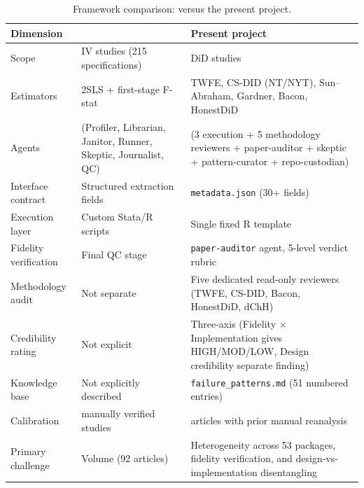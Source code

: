 \begin{table}[H]
\centering
\caption{Framework comparison: \textcite{xu2026scaling} versus the present project.}
\label{tab:framework_comparison}
\small
\begin{tabular}{>{\raggedright\arraybackslash}p{3.4cm}
                >{\raggedright\arraybackslash}p{5.4cm}
                >{\raggedright\arraybackslash}p{5.4cm}}
\toprule
\textbf{Dimension} & \textbf{\textcite{xu2026scaling}} & \textbf{Present project} \\
\midrule
Scope                 & 92 IV studies (215 specifications)                                                   & 53 DiD studies \\[4pt]
Estimators            & 2SLS + first-stage F-stat                                                            & TWFE, CS-DID (NT/NYT), Sun--Abraham, Gardner, Bacon, HonestDiD \\[4pt]
Agents                & 7 (Profiler, Librarian, Janitor, Runner, Skeptic, Journalist, QC)                    & 9 (3 execution + 5 methodology reviewers + paper-auditor + skeptic + pattern-curator + repo-custodian) \\[4pt]
Interface contract    & Structured extraction fields                                                         & \texttt{metadata.json} (30+ fields) \\[4pt]
Execution layer       & Custom Stata/R scripts                                                               & Single fixed R template \\[4pt]
Fidelity verification & Final QC stage                                                                       & \texttt{paper-auditor} agent, 5-level verdict rubric \\[4pt]
Methodology audit     & Not separate                                                                         & Five dedicated read-only reviewers (TWFE, CS-DID, Bacon, HonestDiD, dChH) \\[4pt]
Credibility rating    & Not explicit                                                                         & Three-axis (Fidelity $\times$ Implementation gives HIGH/MOD/LOW, Design credibility separate finding) \\[4pt]
Knowledge base        & Not explicitly described                                                             & \texttt{failure\_patterns.md} (51 numbered entries) \\[4pt]
Calibration           & 67 manually verified studies                                                         & 10 articles with prior manual reanalysis \\[4pt]
Primary challenge     & Volume (92 articles)                                                                 & Heterogeneity across 53 packages, fidelity verification, and design-vs-implementation disentangling \\
\bottomrule
\end{tabular}
\end{table}

